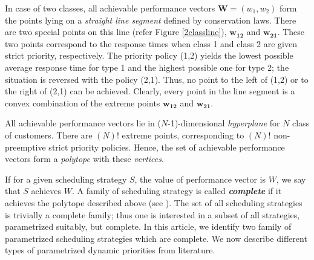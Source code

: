 \documentclass[letterpaper, 10 pt, conference]{ieeeconf}  %
\begin{document}
In case of two classes, all achievable performance vectors $\mathbf{W} = (w_1,w_2)$ form the points lying on a \textit{straight line segment} defined by conservation laws. There are two special points on this line (refer Figure \ref{2classline}), $\mathbf{w_{12}}$ and $\mathbf{w_{21}}$. These two points correspond to the response times when class 1 and class 2 are given strict priority, respectively. The priority policy (1,2) yields the lowest possible average response time for type 1 and the highest possible one for type 2; the situation is reversed with the policy (2,1). Thus, no point to the left of (1,2) or to the right of (2,1) can be achieved. Clearly, every point in the line segment is a convex combination of the extreme points $\mathbf{w_{12}}$ and $\mathbf{w_{21}}$. 


All achievable performance vectors lie in ($N$-1)-dimensional \textit{hyperplane} for $N$ class of customers. There are $(N)!$ extreme points, corresponding to $(N)!$  non-preemptive strict priority policies. Hence, the set of achievable performance vectors form a \textit{polytope} with these \textit{vertices}. 


\indent If for a given scheduling strategy $S$, the value of performance vector is $W$, we say that $S$ achieves $W$. A family of scheduling strategy is called \textbf{\textit{complete}} if it achieves the polytope described above (see \cite{complete}). The set of all scheduling strategies is trivially a complete family; thus one is interested in a subset of all strategies, parametrized suitably, but complete. In this article, we identify two family of parametrized scheduling strategies which are complete. We now describe different types of parametrized dynamic priorities from literature. 
\end{document}
